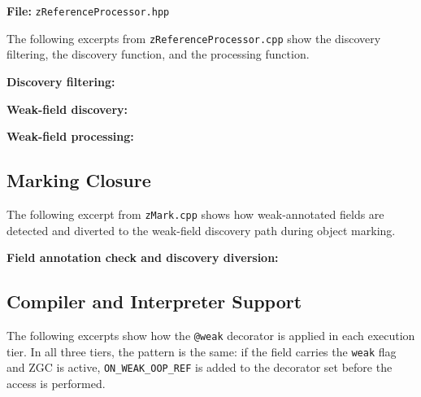 \noindent\textbf{File:} \texttt{zReferenceProcessor.hpp}



\medskip
The following excerpts from \texttt{zReferenceProcessor.cpp} show the discovery filtering, the discovery function, and the processing function.

\medskip
\noindent\textbf{Discovery filtering:}



\noindent\textbf{Weak-field discovery:}



\noindent\textbf{Weak-field processing:}



\subsection{Marking Closure}
\label{app:source-wf-marking}

The following excerpt from \texttt{zMark.cpp} shows how weak-annotated fields are detected and diverted to the weak-field discovery path during object marking.

\medskip
\noindent\textbf{Field annotation check and discovery diversion:}



\subsection{Compiler and Interpreter Support}
\label{app:source-wf-compiler}

The following excerpts show how the \texttt{@weak} decorator is applied in each execution tier. In all three tiers, the pattern is the same: if the field carries the \texttt{weak} flag and \ac{ZGC} is active, \texttt{ON\_WEAK\_OOP\_REF} is added to the decorator set before the access is performed.

